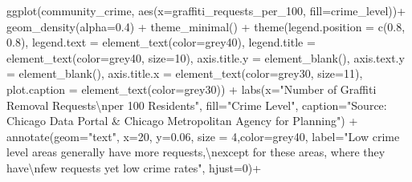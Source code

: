\documentclass[
]{report}
\newenvironment{Shaded}{}{}
\newcommand{\AttributeTok}[1]{\textcolor[rgb]{0.84,0.23,0.29}{#1}}
\newcommand{\DecValTok}[1]{\textcolor[rgb]{0.00,0.36,0.77}{#1}}
\newcommand{\FloatTok}[1]{\textcolor[rgb]{0.00,0.36,0.77}{#1}}
\newcommand{\FunctionTok}[1]{\textcolor[rgb]{0.44,0.26,0.76}{#1}}
\newcommand{\NormalTok}[1]{\textcolor[rgb]{0.14,0.16,0.18}{#1}}
\newcommand{\SpecialCharTok}[1]{\textcolor[rgb]{0.00,0.36,0.77}{#1}}
\newcommand{\StringTok}[1]{\textcolor[rgb]{0.01,0.18,0.38}{#1}}
\begin{document}
\begin{Shaded}
\begin{Highlighting}[]
\FunctionTok{ggplot}\NormalTok{(community\_crime, }\FunctionTok{aes}\NormalTok{(}\AttributeTok{x=}\NormalTok{graffiti\_requests\_per\_100, }\AttributeTok{fill=}\NormalTok{crime\_level))}\SpecialCharTok{+}
  \FunctionTok{geom\_density}\NormalTok{(}\AttributeTok{alpha=}\FloatTok{0.4}\NormalTok{) }\SpecialCharTok{+}
  \FunctionTok{theme\_minimal}\NormalTok{() }\SpecialCharTok{+}
  \FunctionTok{theme}\NormalTok{(}\AttributeTok{legend.position =} \FunctionTok{c}\NormalTok{(}\FloatTok{0.8}\NormalTok{, }\FloatTok{0.8}\NormalTok{),}
        \AttributeTok{legend.text =} \FunctionTok{element\_text}\NormalTok{(}\AttributeTok{color=}\StringTok{\textquotesingle{}grey40\textquotesingle{}}\NormalTok{),}
        \AttributeTok{legend.title =} \FunctionTok{element\_text}\NormalTok{(}\AttributeTok{color=}\StringTok{\textquotesingle{}grey40\textquotesingle{}}\NormalTok{, }\AttributeTok{size=}\DecValTok{10}\NormalTok{),}
        \AttributeTok{axis.title.y =} \FunctionTok{element\_blank}\NormalTok{(),}
        \AttributeTok{axis.text.y =} \FunctionTok{element\_blank}\NormalTok{(),}
        \AttributeTok{axis.title.x =} \FunctionTok{element\_text}\NormalTok{(}\AttributeTok{color=}\StringTok{\textquotesingle{}grey30\textquotesingle{}}\NormalTok{, }\AttributeTok{size=}\DecValTok{11}\NormalTok{),}
        \AttributeTok{plot.caption =} \FunctionTok{element\_text}\NormalTok{(}\AttributeTok{color=}\StringTok{\textquotesingle{}grey30\textquotesingle{}}\NormalTok{)) }\SpecialCharTok{+}
  \FunctionTok{labs}\NormalTok{(}\AttributeTok{x=}\StringTok{"Number of Graffiti Removal Requests}\SpecialCharTok{\textbackslash{}n}\StringTok{per 100 Residents"}\NormalTok{,}
       \AttributeTok{fill=}\StringTok{"Crime Level"}\NormalTok{,}
       \AttributeTok{caption=}\StringTok{"Source: Chicago Data Portal \& Chicago Metropolitan Agency for Planning"}\NormalTok{) }\SpecialCharTok{+}
  \FunctionTok{annotate}\NormalTok{(}\AttributeTok{geom=}\StringTok{"text"}\NormalTok{, }\AttributeTok{x=}\DecValTok{20}\NormalTok{, }\AttributeTok{y=}\FloatTok{0.06}\NormalTok{, }\AttributeTok{size =} \DecValTok{4}\NormalTok{,}\AttributeTok{color=}\StringTok{\textquotesingle{}grey40\textquotesingle{}}\NormalTok{,}
           \AttributeTok{label=}\StringTok{"Low crime level areas generally have more requests,}\SpecialCharTok{\textbackslash{}n}\StringTok{except for these areas, where they have}\SpecialCharTok{\textbackslash{}n}\StringTok{few requests yet low crime rates"}\NormalTok{, }\AttributeTok{hjust=}\DecValTok{0}\NormalTok{)}\SpecialCharTok{+}

\end{Highlighting}
\end{Shaded}
\end{document}
